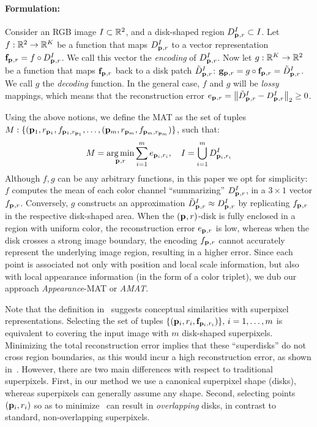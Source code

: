 \documentclass[10pt,twocolumn,letterpaper]{article}
\begin{document}
\paragraph{Formulation:} Consider an RGB image $I\subset\mathbb{R}^2$, and a disk-shaped region $D_{\mathbf{p}_{},r}^I \subset I$.
Let $f:\mathbb{R}^2 \rightarrow \mathbb{R}^K$ be a function that maps $D_{\mathbf{p}_{},r}^I$ to a vector representation $\mathbf{f}_{\mathbf{p}_{},r}=f\circ D_{\mathbf{p}_{},r}^I$. 
We call this vector the \emph{encoding} of $D_{\mathbf{p}_{},r}^I$. 
Now let $g:\mathbb{R}^K \rightarrow \mathbb{R}^2$ be a function that maps $\mathbf{f}_{\mathbf{p}_{},r}$ back to a disk patch $\tilde{D}_{\mathbf{p}_{},r}^I$: 
$\mathbf{g}_{\mathbf{p}_{},r} = g \circ \mathbf{f}_{\mathbf{p}_{},r} = \tilde{D}_{\mathbf{p}_{},r}^I$. We call $g$ the \emph{decoding} function.
In the general case, $f$ and $g$ will be \emph{lossy} mappings, which means that the reconstruction error 
$e_{\mathbf{p}_{},r} = \left \lVert  \tilde{D}_{\mathbf{p}_{},r}^I - D_{\mathbf{p}_{},r}^I \right \rVert_2 \geq 0$. 

Using the above notions, we define the MAT as the set of tuples 
$M:\{ ( \mathbf{p}_{1},r_{\mathbf{p}_{1}}, f_{\mathbf{p}_{1},r_{\mathbf{p}_{1}}}, \ldots, ( \mathbf{p}_{m},r_{\mathbf{p}_{m}}, f_{\mathbf{p}_{m},r_{\mathbf{p}_{m}}} ) \}$, such that:
\begin{equation}
M = \operatorname*{arg\,min}_{\mathbf{p}_{},r}{\sum_{i=1}^m e_{\mathbf{p}_{i},r_i}},\quad I=\bigcup_{i=1}^m D_{\mathbf{p}_{i},r_i}^I 
\label{eq:minimization}
\end{equation}
Although $f,g$ can be any arbitrary functions, in this paper we opt for simplicity:
$f$ computes the mean of each color channel ``summarizing'' $D_{\mathbf{p}_{},r}^I$, in a $3\times1$ vector $f_{\mathbf{p}_{},r}$.
Conversely, $g$ constructs an approximation $\tilde{D}_{\mathbf{p}_{},r}^I \approx D_{\mathbf{p}_{},r}^I$ by replicating $f_{\mathbf{p}_{},r}$ in the
respective disk-shaped area.
When the $(\mathbf{p}_{},r)$-disk is fully enclosed in a region with uniform color, the reconstruction error $e_{\mathbf{p}_{},r}$
is low, whereas when the disk crosses a strong image boundary, the encoding $f_{\mathbf{p}_{},r}$ cannot accurately represent
the underlying image region, resulting in a higher error. Since each point is associated not only with position and local
scale information, but also with local appearance information (in the form of a color triplet), we dub our approach
\emph{Appearance}-MAT or \emph{AMAT}.

Note that the definition in~ suggests conceptual similarities with superpixel representations.
Selecting the set of tuples $\{(\mathbf{p}_{i},r_i,\mathbf{f}_{\mathbf{p}_{i},r_i})\},\,i=1,\ldots,m$ is equivalent to covering the input image
with $m$ disk-shaped superpixels. Minimizing the total reconstruction error implies that these ``superdisks'' do not
cross region boundaries, as this would incur a high reconstruction error, as shown in~.
However, there are two main differences with respect to traditional superpixels.
First, in our method we use a canonical
superpixel shape (disks), whereas superpixels can generally assume any shape. Second, selecting points $(\mathbf{p}_{i},r_i)$
so as to minimize~ can result in \emph{overlapping} disks, in contrast to standard, 
non-overlapping superpixels.
\end{document}
